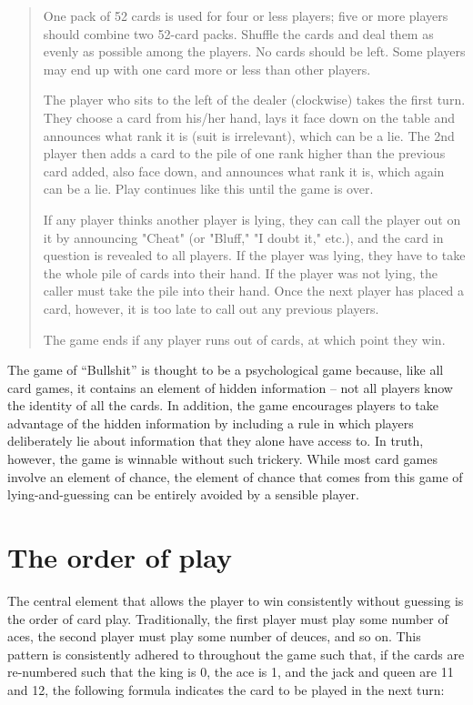 \documentclass[12pt]{article}
\begin{document}
\begin{quote}
One pack of 52 cards is used for four or less players; five or more players should combine two 52-card packs. Shuffle the cards and deal them as evenly as possible among the players. No cards should be left. Some players may end up with one card more or less than other players.

The player who sits to the left of the dealer (clockwise) takes the first turn. They choose a card from his/her hand, lays it face down on the table and announces what rank it is (suit is irrelevant), which can be a lie. The 2nd player then adds a card to the pile of one rank higher than the previous card added, also face down, and announces what rank it is, which again can be a lie. Play continues like this until the game is over.

If any player thinks another player is lying, they can call the player out on it by announcing "Cheat" (or "Bluff," "I doubt it," etc.), and the card in question is revealed to all players. If the player was lying, they have to take the whole pile of cards into their hand. If the player was not lying, the caller must take the pile into their hand. Once the next player has placed a card, however, it is too late to call out any previous players.

The game ends if any player runs out of cards, at which point they win.
\end{quote}

The game of ``Bullshit'' is thought to be a psychological game because, like
all card games, it contains an element of hidden information -- not all players
know the identity of all the cards. In addition, the game encourages players to
take advantage of the hidden information by including a rule in which players 
deliberately lie about information that they alone have access to. In truth,
however, the game is winnable without such trickery. While most card games
involve an element of chance, the element of chance that comes from this game
of lying-and-guessing can be entirely avoided by a sensible player.

\section{The order of play}

The central element that allows the player to win consistently without guessing
is the order of card play. Traditionally, the first player must play some
number of aces, the second player must play some number of deuces, and so on.
This pattern is consistently adhered to throughout the game such that, if the
cards are re-numbered such that the king is 0, the ace is 1, and the jack and
queen are 11 and 12, the following formula indicates the card to be played in
the next turn:
\end{document}

